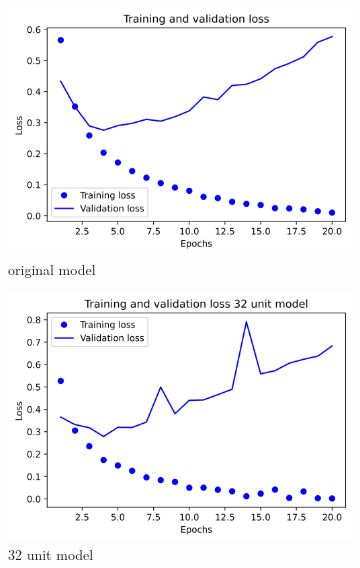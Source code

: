\documentclass{article}
\begin{document}
    \begin{figure}[H]
        \begin{subfigure}{.5\textwidth}
            \centering
            \includegraphics[width=\linewidth]{images/movies/original.png}
            \caption{original model}
            \label{fig2:sfig1}
        \end{subfigure}
        \begin{subfigure}{.5\textwidth}
            \centering
            \includegraphics[width=\linewidth]{images/movies/3.png}
            \caption{32 unit model}
            \label{fig2:sfig2}
        \end{subfigure}
        \begin{subfigure}{.5\textwidth}
            \centering

\end{subfigure}
\end{figure}
\end{document}
